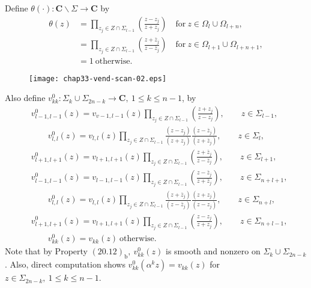 \documentclass{surv-l}
\theoremstyle{plain}
\theoremstyle{definition}
\numberwithin{equation}{chapter}
\begin{document}
Define $\theta(\cdot):\mathbf{C}\backslash \Sigma\rightarrow \mathbf{C}$ by
\setcounter{equation}{24}
\begin{align}\label{eq33.25}
\theta(z)&=\prod_{z_{j}\in Z\cap\Sigma_{l-1}}\left(\frac{z-z_{j}}{z+z_{j}}\right)\quad \mathrm{for}\ z\in\Omega_{l}\cup\Omega_{l+n},\\
&=\displaystyle \prod_{z_{j}\in Z\cap\Sigma_{l-1}}\left(\frac{z+\overline{z}_{j}}{z-\overline{z}_{j}}\right) \quad \mathrm{for}\ z\in\Omega_{l+1}\cup\Omega_{l+n+1},\nonumber \\
&=1\ \mathrm{otherwise}.\nonumber
\end{align}
\begin{figure}
\texttt{[image: chap33-vend-scan-02.eps]}
\caption{}\label{fig13}
\end{figure}
Also define $v_{kk}^{0}:\Sigma_{k}\cup\Sigma_{2n-k}\rightarrow \mathbf{C},\ 1\leq k\leq n-1$, by
\begin{align}\label{eq33.26}
&v_{l-1,l-1}^{0}(z)=v_{v-1,l-1}(z)\displaystyle \prod_{z_{j}\in Z\cap\Sigma_{l-1}}\left(\frac{z+z_{j}}{z-z_{j}}\right),\qquad z\in\Sigma_{l-1},\\\nonumber
&\qquad v_{l,l}^{0}(z)=v_{l,l}(z)\prod_{z_{j}\in Z\cap\Sigma_{l-1}}\frac{(z-z_{j})}{(z+z_{j})}\frac{(z-\overline{z}_{j})}{(z+\overline{z}_{j})},\qquad z\in\Sigma_{l},\\\nonumber
& v_{l+1,l+1}^{0}(z)=v_{l+1,l+1}(z)\prod_{z_{j}\in Z\cap\Sigma_{l-1}}\left(\frac{z+\overline{z}_{j}}{z-\overline{z}_{j}}\right),\qquad z\in\Sigma_{l+1},\\\nonumber
& v_{l-1,l-1}^{0}(z)=v_{l-1,l-1}(z)\prod_{z_{j}\in Z\cap\Sigma_{l-1}}\left(\frac{z-\overline{z}_{j}}{z+\overline{z}_{j}}\right),\qquad z\in\Sigma_{n+l+1},\\\nonumber
&\qquad v_{l,l}^{0}(z)=v_{l,l}(z)\prod_{z_{j}\in Z\cap\Sigma_{l-1}}\frac{(z+\overline{z}_{j})}{(z-\overline{z}_{j})}\frac{(z+z_{j})}{(z-z_{j})},\qquad z\in\Sigma_{n+l},\\\nonumber
&v_{l+1,l+1}^{0}(z)=v_{l+1,l+1}(z)\prod_{z_{j}\in Z\cap\Sigma_{l-1}}\left(\frac{z-z_{j}}{z+z_{j}}\right),\qquad z\in\Sigma_{n+l-1},\\\nonumber
&\qquad v_{kk}^{0}(z)=v_{kk}(z)\ \mathrm{otherwise}.
\end{align}
Note that by Property $(20.12)_{\mathrm{b}},\ v_{kk}^{0}(z)$ is smooth and nonzero on $\Sigma_{k}\cup\Sigma_{2n-k}$. Also, direct computation shows $v_{kk}^{0}(\alpha^{k}z)=v_{kk}(z)$ for $z\in\Sigma_{2n-k},\ 1\leq k\leq n -1$.
\end{document}
